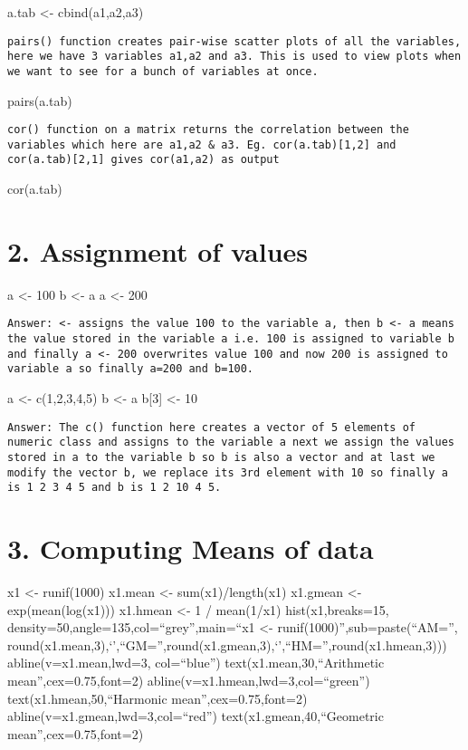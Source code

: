 \documentclass[]{article}
\begin{document}
a.tab \textless{}- cbind(a1,a2,a3)

\begin{verbatim}
pairs() function creates pair-wise scatter plots of all the variables, here we have 3 variables a1,a2 and a3. This is used to view plots when we want to see for a bunch of variables at once.
\end{verbatim}

pairs(a.tab)

\begin{verbatim}
cor() function on a matrix returns the correlation between the variables which here are a1,a2 & a3. Eg. cor(a.tab)[1,2] and cor(a.tab)[2,1] gives cor(a1,a2) as output
\end{verbatim}

cor(a.tab)

\section{2. Assignment of values}\label{assignment-of-values}

a \textless{}- 100 b \textless{}- a a \textless{}- 200

\begin{verbatim}
Answer: <- assigns the value 100 to the variable a, then b <- a means the value stored in the variable a i.e. 100 is assigned to variable b and finally a <- 200 overwrites value 100 and now 200 is assigned to variable a so finally a=200 and b=100.
\end{verbatim}

a \textless{}- c(1,2,3,4,5) b \textless{}- a b{[}3{]} \textless{}- 10

\begin{verbatim}
Answer: The c() function here creates a vector of 5 elements of numeric class and assigns to the variable a next we assign the values stored in a to the variable b so b is also a vector and at last we modify the vector b, we replace its 3rd element with 10 so finally a is 1 2 3 4 5 and b is 1 2 10 4 5.
\end{verbatim}

\section{3. Computing Means of data}\label{computing-means-of-data}

x1 \textless{}- runif(1000) x1.mean \textless{}- sum(x1)/length(x1)
x1.gmean \textless{}- exp(mean(log(x1))) x1.hmean \textless{}- 1 /
mean(1/x1) hist(x1,breaks=15,
density=50,angle=135,col=``grey'',main=``x1 \textless{}-
runif(1000)'',sub=paste(``AM='',
round(x1.mean,3),`\textbar{}',``GM='',round(x1.gmean,3),`\textbar{}',``HM='',round(x1.hmean,3)))
abline(v=x1.mean,lwd=3, col=``blue'') text(x1.mean,30,``Arithmetic
mean'',cex=0.75,font=2) abline(v=x1.hmean,lwd=3,col=``green'')
text(x1.hmean,50,``Harmonic mean'',cex=0.75,font=2)
abline(v=x1.gmean,lwd=3,col=``red'') text(x1.gmean,40,``Geometric
mean'',cex=0.75,font=2)
\end{document}
